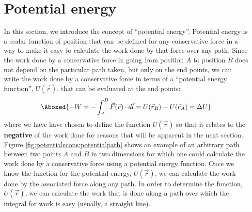 \section{Potential energy}
In this section, we introduce the concept of ``potential energy''. Potential energy is a scalar function of position that can be defined for any conservative force in a way to make it easy to calculate the work done by that force over any path. Since the work done by a conservative force in going from position $A$ to position $B$ does not depend on the particular path taken, but only on the end points, we can write the work done by a conservative force in terms of a ``potential energy function'', $U(\vec r)$, that can be evaluated at the end points:
\begin{align}
\Aboxed{-W = - \int_A^B \vec F(\vec r) \cdot d\vec l = U(\vec r_B) - U(\vec r_A) = \Delta U}
\end{align}
where we have have chosen to define the function $U(\vec r)$ so that it relates to the \textbf{negative} of the work done for reasons that will be apparent in the next section. Figure \ref{fig:potentialecons:potentialpath} shows an example of an arbitrary path between two points $A$ and $B$ in two dimensions for which one could calculate the work done by a conservative force using a potential energy function.
Once we know the function for the potential energy, $U(\vec r)$, we can calculate the work done by the associated force along any path. In order to determine the function, $U(\vec r)$, we can calculate the work that is done along a path over which the integral for work is easy (usually, a straight line). 

